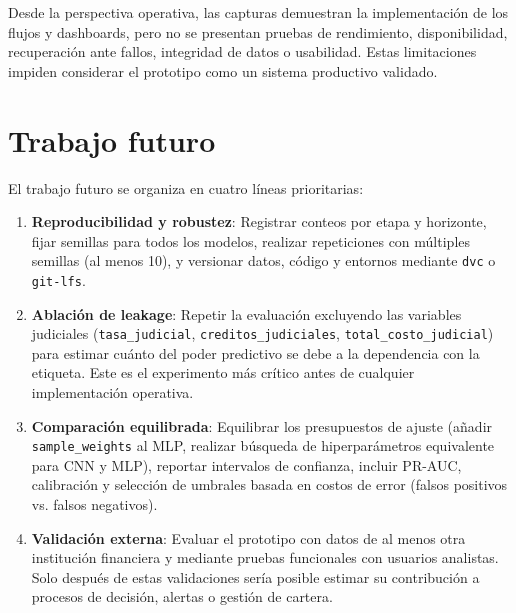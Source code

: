 Desde la perspectiva operativa, las capturas demuestran la implementación de los flujos y dashboards, pero no se presentan pruebas de rendimiento, disponibilidad, recuperación ante fallos, integridad de datos o usabilidad. Estas limitaciones impiden considerar el prototipo como un sistema productivo validado.

\section{Trabajo futuro}

El trabajo futuro se organiza en cuatro líneas prioritarias:

\begin{enumerate}
    \item \textbf{Reproducibilidad y robustez}: Registrar conteos por etapa y horizonte, fijar semillas para todos los modelos, realizar repeticiones con múltiples semillas (al menos 10), y versionar datos, código y entornos mediante \texttt{dvc} o \texttt{git-lfs}.
    
    \item \textbf{Ablación de leakage}: Repetir la evaluación excluyendo las variables judiciales (\texttt{tasa\_judicial}, \texttt{creditos\_judiciales}, \texttt{total\_costo\_judicial}) para estimar cuánto del poder predictivo se debe a la dependencia con la etiqueta. Este es el experimento más crítico antes de cualquier implementación operativa.
    
    \item \textbf{Comparación equilibrada}: Equilibrar los presupuestos de ajuste (añadir \texttt{sample\_weights} al MLP, realizar búsqueda de hiperparámetros equivalente para CNN y MLP), reportar intervalos de confianza, incluir PR-AUC, calibración y selección de umbrales basada en costos de error (falsos positivos vs. falsos negativos).
    
    \item \textbf{Validación externa}: Evaluar el prototipo con datos de al menos otra institución financiera y mediante pruebas funcionales con usuarios analistas. Solo después de estas validaciones sería posible estimar su contribución a procesos de decisión, alertas o gestión de cartera.
\end{enumerate}
